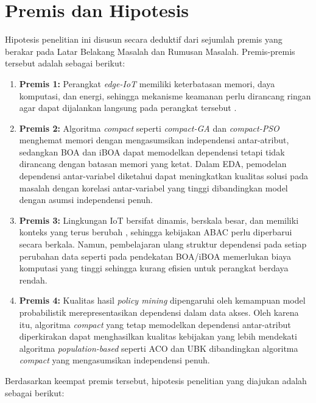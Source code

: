 \section{Premis dan Hipotesis}

Hipotesis penelitian ini disusun secara deduktif dari sejumlah premis yang berakar pada Latar Belakang Masalah dan Rumusan Masalah.
Premis-premis tersebut adalah sebagai berikut:

\begin{enumerate}
    \item \textbf{Premis 1:} Perangkat \textit{edge-IoT} memiliki keterbatasan memori, daya komputasi, dan energi, sehingga mekanisme keamanan perlu dirancang ringan agar dapat dijalankan langsung pada perangkat tersebut \parencite{canavese_security_2024}.
    \item \textbf{Premis 2:} Algoritma \textit{compact} seperti \textit{compact-GA} dan \textit{compact-PSO}\label{first:compact-pso} menghemat memori dengan mengasumsikan independensi antar-atribut, sedangkan BOA dan iBOA\label{first:iboa} dapat memodelkan dependensi tetapi tidak dirancang dengan batasan memori yang ketat. Dalam EDA\label{first:eda}, pemodelan dependensi antar-variabel diketahui dapat meningkatkan kualitas solusi pada masalah dengan korelasi antar-variabel yang tinggi dibandingkan model dengan asumsi independensi penuh.
    \item \textbf{Premis 3:} Lingkungan IoT bersifat dinamis, berskala besar, dan memiliki konteks yang terus berubah \parencite{ragothaman_access_2023}, sehingga kebijakan ABAC perlu diperbarui secara berkala. Namun, pembelajaran ulang struktur dependensi pada setiap perubahan data seperti pada pendekatan BOA/iBOA memerlukan biaya komputasi yang tinggi sehingga kurang efisien untuk perangkat berdaya rendah.
    \item \textbf{Premis 4:} Kualitas hasil \textit{policy mining} dipengaruhi oleh kemampuan model probabilistik merepresentasikan dependensi dalam data akses. Oleh karena itu, algoritma \textit{compact} yang tetap memodelkan dependensi antar-atribut diperkirakan dapat menghasilkan kualitas kebijakan yang lebih mendekati algoritma \textit{population-based} seperti ACO dan UBK dibandingkan algoritma \textit{compact} yang mengasumsikan independensi penuh.
\end{enumerate}

Berdasarkan keempat premis tersebut, hipotesis penelitian yang diajukan adalah sebagai berikut:


